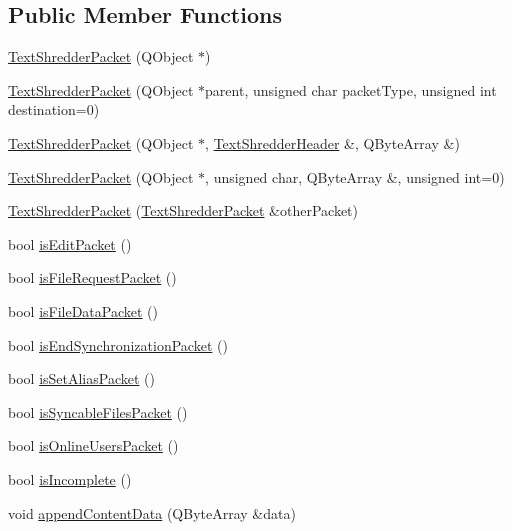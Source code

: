 \subsection*{Public Member Functions}
\begin{DoxyCompactItemize}
\item 
\hyperlink{class_text_shredder_packet_a8b6a8953275c2f3b35e5829b61310ef3}{TextShredderPacket} (QObject $\ast$)
\item 
\hyperlink{class_text_shredder_packet_a009abc4d71b449c2bf91d01b33049ed0}{TextShredderPacket} (QObject $\ast$parent, unsigned char packetType, unsigned int destination=0)
\item 
\hyperlink{class_text_shredder_packet_a284467aa2879c552687e54286f5d9b72}{TextShredderPacket} (QObject $\ast$, \hyperlink{class_text_shredder_header}{TextShredderHeader} \&, QByteArray \&)
\item 
\hyperlink{class_text_shredder_packet_a24abeae2c2825cdc18d0cd44d2e029e4}{TextShredderPacket} (QObject $\ast$, unsigned char, QByteArray \&, unsigned int=0)
\item 
\hyperlink{class_text_shredder_packet_a12de40a56989203aa16e4b1f973f1fd1}{TextShredderPacket} (\hyperlink{class_text_shredder_packet}{TextShredderPacket} \&otherPacket)
\item 
bool \hyperlink{class_text_shredder_packet_a0dbf8f5f92606e68f0d5fff0a05c5706}{isEditPacket} ()
\item 
bool \hyperlink{class_text_shredder_packet_ad381881d43e80c3e5efbb836fc194344}{isFileRequestPacket} ()
\item 
bool \hyperlink{class_text_shredder_packet_a6a81e27703b5a654a474bd551d87d43e}{isFileDataPacket} ()
\item 
bool \hyperlink{class_text_shredder_packet_a99d58e7565f91e84c7542b84133efea5}{isEndSynchronizationPacket} ()
\item 
bool \hyperlink{class_text_shredder_packet_aed86c5a608385a57d9cf94de8578bf37}{isSetAliasPacket} ()
\item 
bool \hyperlink{class_text_shredder_packet_a92c1abb32d95601b6fc2e47dc0c1b2f3}{isSyncableFilesPacket} ()
\item 
bool \hyperlink{class_text_shredder_packet_a524b88338d3b28c4c7582e124ac8396e}{isOnlineUsersPacket} ()
\item 
bool \hyperlink{class_text_shredder_packet_a7b04ce6a4d8147b67e287fdf5547cf4b}{isIncomplete} ()
\item 
void \hyperlink{class_text_shredder_packet_ad6a11eece39b3a067bdbe619307bce18}{appendContentData} (QByteArray \&data)

\end{DoxyCompactItemize}
